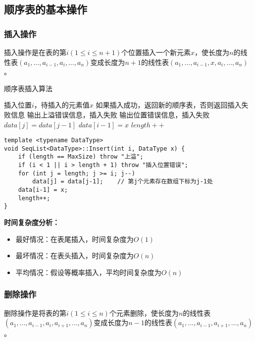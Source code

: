 \documentclass[12pt,a4paper]{amsart}
\begin{document}
\subsection{顺序表的基本操作}

\subsubsection{插入操作}

插入操作是在表的第$i(1 \leq i \leq n+1)$个位置插入一个新元素$x$，使长度为$n$的线性表$(a_1, \ldots, a_{i-1}, a_i, \ldots, a_n)$变成长度为$n+1$的线性表$(a_1, \ldots, a_{i-1}, x, a_i, \ldots, a_n)$。

\begin{algorithm}[H]
\caption{顺序表插入算法}
\begin{algorithmic}[1]
\REQUIRE 插入位置$i$，待插入的元素值$x$
\ENSURE 如果插入成功，返回新的顺序表，否则返回插入失败信息
    \STATE 输出上溢错误信息，插入失败
\ENDIF
{}
    \STATE 输出位置错误信息，插入失败
\ENDIF
{}
    \STATE $data[j] = data[j-1]$ 
\ENDFOR
\STATE $data[i-1] = x$ 
\STATE $length++$ 
\end{algorithmic}
\end{algorithm}

\begin{lstlisting}[caption=顺序表插入操作实现]
template <typename DataType>
void SeqList<DataType>::Insert(int i, DataType x) {
    if (length == MaxSize) throw "上溢";
    if (i < 1 || i > length + 1) throw "插入位置错误";
    for (int j = length; j >= i; j--)
        data[j] = data[j-1];    // 第j个元素存在数组下标为j-1处
    data[i-1] = x;
    length++;
}
\end{lstlisting}

\textbf{时间复杂度分析：}
\begin{itemize}
\item 最好情况：在表尾插入，时间复杂度为$O(1)$
\item 最坏情况：在表头插入，时间复杂度为$O(n)$
\item 平均情况：假设等概率插入，平均时间复杂度为$O(n)$
\end{itemize}

\subsubsection{删除操作}

删除操作是将表的第$i(1 \leq i \leq n)$个元素删除，使长度为$n$的线性表$(a_1, \ldots, a_{i-1}, a_i, a_{i+1}, \ldots, a_n)$变成长度为$n-1$的线性表$(a_1, \ldots, a_{i-1}, a_{i+1}, \ldots, a_n)$。
\end{document}
